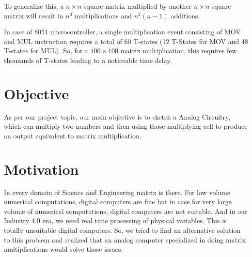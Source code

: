 To generalize this, a $n \times n$ square matrix multiplied by another $n \times n$ square matrix will result in $n^3$ multiplications and $n^2(n-1)$ additions.

In case of 8051 microcontroller, a single multiplication event consisting of MOV and MUL instruction requires a total of 60 T-states (12 T-States for MOV\cite{8051_T} and 48 T-states for MUL\cite{8051_T}). So, for a $100\times 100$ matrix multiplication, this requires few thousands of T-states leading to a noticeable time delay.


\section{Objective}
As per our project topic, our main objective is to sketch a Analog Circuitry, which can multiply two numbers and then using those multiplying cell to produce an output equivalent to matrix multiplication.

\section{Motivation}
In every domain of Science and Engineering matrix is there. For low volume numerical computations, digital computers are fine but in case for very large volume of numerical computations, digital computers are not suitable. And in our Industry 4.0 era, we need real time processing of physical variables. This is totally unsuitable digital computers. So, we tried to find an alternative solution to this problem and realized that an analog computer specialized in doing matrix multiplications would solve those issues.

\nopagebreak